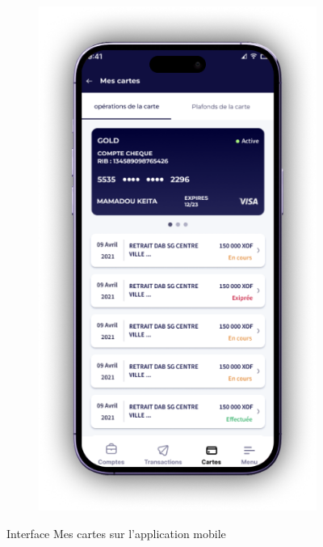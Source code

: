 \begin{figure}[!ht]
\begin{subfigure}[b]{0.49\textwidth}
        \centering
        \includegraphics[width=\textwidth]{images/screens/mobileApp/device/Cards Details D.png}
    \end{subfigure}
       \caption{Interface Mes cartes sur l'application mobile}
\end{figure}

\newpage

